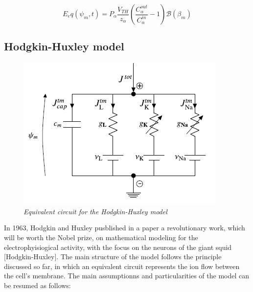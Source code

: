\documentclass[a4paper]{article}
\begin{document}
\begin{equation}
E_eq(\psi_m,t) = P_{\alpha}\frac{V_{TH}}{z_{\alpha}} \left(\frac{C_{\alpha}^{out}}{C_{\alpha}^{in}} - 1\right)\mathcal{B}(\beta_m)
\end{equation}



\subsection{Hodgkin-Huxley model}

\begin{figure}[H]
	\begin{center}
		\includegraphics[scale=0.9]{HH.png} 
	\end{center} 
	\caption{\textit{Equivalent circuit for the Hodgkin-Huxley model}}
	
\end{figure}


In 1963, Hodgkin and Huxley pusblished in a paper a revolutionary work, which will be worth the Nobel prize, on mathematical modeling for the electrophyisiogical activity, with the focus on the neurons of the giant squid [Hodgkin-Huxley]. The main structure of the model follows the principle discussed so far, in which an equivalent circuit represents the ion flow between the cell's membrane. The main assumptionns and particularities of the model can be resumed as follows:
\end{document}
